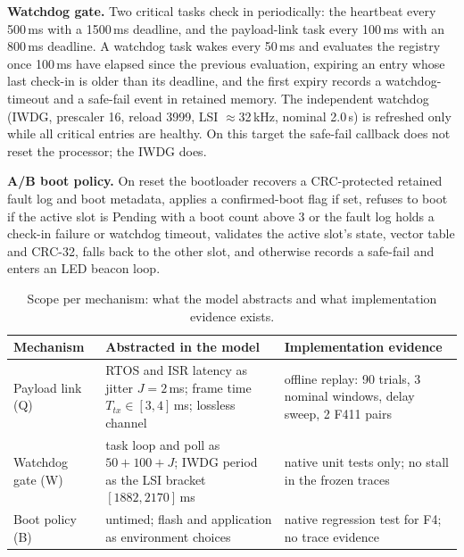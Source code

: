 \documentclass[conference,a4paper]{IEEEtran}
\begin{document}
\textbf{Watchdog gate.} Two critical tasks check in periodically: the heartbeat every 500\,ms with a 1500\,ms deadline, and the payload-link task every 100\,ms with an 800\,ms deadline. A watchdog task wakes every 50\,ms and evaluates the registry once 100\,ms have elapsed since the previous evaluation, expiring an entry whose last check-in is older than its deadline, and the first expiry records a watchdog-timeout and a safe-fail event in retained memory. The independent watchdog (IWDG, prescaler 16, reload 3999, LSI $\approx$32\,kHz, nominal 2.0\,s) is refreshed only while all critical entries are healthy. On this target the safe-fail callback does not reset the processor; the IWDG does.

\textbf{A/B boot policy.} On reset the bootloader recovers a CRC-protected retained fault log and boot metadata, applies a confirmed-boot flag if set, refuses to boot if the active slot is Pending with a boot count above 3 or the fault log holds a check-in failure or watchdog timeout, validates the active slot's state, vector table and CRC-32, falls back to the other slot, and otherwise records a safe-fail and enters an LED beacon loop.

\begin{table}[t]
\centering\footnotesize
\caption{Scope per mechanism: what the model abstracts and what implementation evidence exists.}
\label{tab:scope}
\setlength{\tabcolsep}{3.5pt}
\begin{tabularx}{\columnwidth}{@{}l >{\raggedright\arraybackslash}X >{\raggedright\arraybackslash}X@{}}
\toprule
Mechanism & Abstracted in the model & Implementation evidence \\
\midrule
Payload link (Q) & RTOS and ISR latency as jitter $J{=}2$\,ms; frame time $T_{tx}\in[3,4]$\,ms; lossless channel & offline replay: 90 trials, 3 nominal windows, delay sweep, 2 F411 pairs \\
Watchdog gate (W) & task loop and poll as $50{+}100{+}J$; IWDG period as the LSI bracket $[1882,2170]$\,ms & native unit tests only; no stall in the frozen traces \\
Boot policy (B) & untimed; flash and application as environment choices & native regression test for F4; no trace evidence \\
\bottomrule
\end{tabularx}
\end{table}
\end{document}
